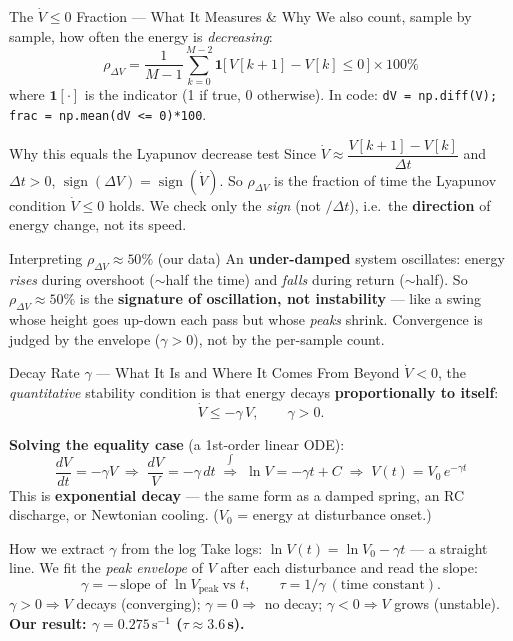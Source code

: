 \documentclass[10pt]{beamer}
\begin{document}
\begin{frame}{The $\dot V\le 0$ Fraction — What It Measures \& Why}
  \small
  We also count, sample by sample, how often the energy is \emph{decreasing}:
  \[
    \rho_{\Delta V}=\frac{1}{M-1}\sum_{k=0}^{M-2}
      \mathbf{1}\!\bigl[\,V[k{+}1]-V[k]\le 0\,\bigr]\times 100\%
  \]
  where $\mathbf{1}[\cdot]$ is the indicator (1 if true, 0 otherwise).
  In code: \texttt{dV = np.diff(V); frac = np.mean(dV <= 0)*100}.
 
  \begin{block}{Why this equals the Lyapunov decrease test}
    Since $\dot V \approx \dfrac{V[k{+}1]-V[k]}{\Delta t}$ and $\Delta t>0$,
    $\operatorname{sign}(\Delta V)=\operatorname{sign}(\dot V)$.
    So $\rho_{\Delta V}$ is the fraction of time the Lyapunov condition
    $\dot V\le 0$ holds. We check only the \emph{sign} (not $/\Delta t$),
    i.e.\ the \textbf{direction} of energy change, not its speed.
  \end{block}
 
  \begin{alertblock}{Interpreting $\rho_{\Delta V}\approx 50\%$ (our data)}
    An \textbf{under-damped} system oscillates: energy \emph{rises} during
    overshoot ($\sim$half the time) and \emph{falls} during return
    ($\sim$half). So $\rho_{\Delta V}\approx 50\%$ is the \textbf{signature of
    oscillation, not instability} — like a swing whose height goes up-down each
    pass but whose \emph{peaks} shrink. Convergence is judged by the envelope
    ($\gamma>0$), not by the per-sample count.
  \end{alertblock}
\end{frame}
 
\begin{frame}{Decay Rate $\gamma$ — What It Is and Where It Comes From}
  \small
  Beyond $\dot V<0$, the \emph{quantitative} stability condition is that energy
  decays \textbf{proportionally to itself}:
  \[
    \dot V \le -\gamma\,V , \qquad \gamma>0 .
  \]
 
  \textbf{Solving the equality case} (a 1st-order linear ODE):
  \[
    \frac{dV}{dt}=-\gamma V
    \;\Rightarrow\; \frac{dV}{V}=-\gamma\,dt
    \;\stackrel{\textstyle\int}{\Longrightarrow}\; \ln V=-\gamma t+C
    \;\Rightarrow\; \boxed{V(t)=V_0\,e^{-\gamma t}}
  \]
  This is \textbf{exponential decay} — the same form as a damped spring, an RC
  discharge, or Newtonian cooling. ($V_0$ = energy at disturbance onset.)
 
  \begin{block}{How we extract $\gamma$ from the log}
    Take logs: $\ln V(t)=\ln V_0-\gamma t$ — a straight line. We fit the
    \emph{peak envelope} of $V$ after each disturbance and read the slope:
    \[
      \gamma = -\,\text{slope of } \ln V_{\text{peak}}\ \text{vs } t,
      \qquad \tau = 1/\gamma\ (\text{time constant}).
    \]
    $\gamma>0 \Rightarrow V$ decays (converging);\;
    $\gamma=0 \Rightarrow$ no decay;\;
    $\gamma<0 \Rightarrow V$ grows (unstable).
    \;\textbf{Our result: $\gamma = 0.275\,\text{s}^{-1}$ ($\tau\approx 3.6$\,s).}
  \end{block}
\end{frame}
 
\end{document}
